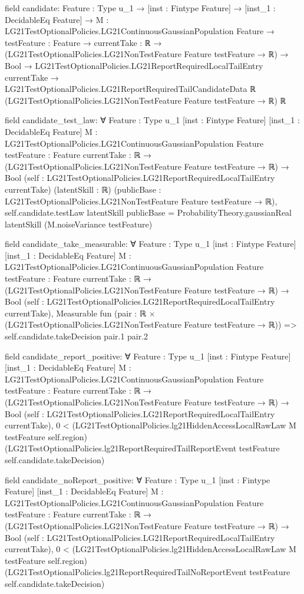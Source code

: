 \documentclass[10pt]{article}
\begin{document}
\begin{ReviewVerbatim}
field candidate:
{Feature : Type u_1} →
  [inst : Fintype Feature] →
    [inst_1 : DecidableEq Feature] →
      {M : LG21TestOptionalPolicies.LG21ContinuousGaussianPopulation Feature} →
        {testFeature : Feature} →
          {currentTake : ℝ → (LG21TestOptionalPolicies.LG21NonTestFeature Feature testFeature → ℝ) → Bool} →
            LG21TestOptionalPolicies.LG21ReportRequiredLocalTailEntry currentTake →
              LG21TestOptionalPolicies.LG21ReportRequiredTailCandidateData ℝ
                (LG21TestOptionalPolicies.LG21NonTestFeature Feature testFeature → ℝ) ℝ

field candidate_test_law:
∀ {Feature : Type u_1} [inst : Fintype Feature] [inst_1 : DecidableEq Feature]
  {M : LG21TestOptionalPolicies.LG21ContinuousGaussianPopulation Feature} {testFeature : Feature}
  {currentTake : ℝ → (LG21TestOptionalPolicies.LG21NonTestFeature Feature testFeature → ℝ) → Bool}
  (self : LG21TestOptionalPolicies.LG21ReportRequiredLocalTailEntry currentTake) (latentSkill : ℝ)
  (publicBase : LG21TestOptionalPolicies.LG21NonTestFeature Feature testFeature → ℝ),
  self.candidate.testLaw latentSkill publicBase =
    ProbabilityTheory.gaussianReal latentSkill (M.noiseVariance testFeature)

field candidate_take_measurable:
∀ {Feature : Type u_1} [inst : Fintype Feature] [inst_1 : DecidableEq Feature]
  {M : LG21TestOptionalPolicies.LG21ContinuousGaussianPopulation Feature} {testFeature : Feature}
  {currentTake : ℝ → (LG21TestOptionalPolicies.LG21NonTestFeature Feature testFeature → ℝ) → Bool}
  (self : LG21TestOptionalPolicies.LG21ReportRequiredLocalTailEntry currentTake),
  Measurable fun (pair : ℝ × (LG21TestOptionalPolicies.LG21NonTestFeature Feature testFeature → ℝ)) =>
    self.candidate.takeDecision pair.1 pair.2

field candidate_report_positive:
∀ {Feature : Type u_1} [inst : Fintype Feature] [inst_1 : DecidableEq Feature]
  {M : LG21TestOptionalPolicies.LG21ContinuousGaussianPopulation Feature} {testFeature : Feature}
  {currentTake : ℝ → (LG21TestOptionalPolicies.LG21NonTestFeature Feature testFeature → ℝ) → Bool}
  (self : LG21TestOptionalPolicies.LG21ReportRequiredLocalTailEntry currentTake),
  0 <
    (LG21TestOptionalPolicies.lg21HiddenAccessLocalRawLaw M testFeature self.region)
      (LG21TestOptionalPolicies.lg21ReportRequiredTailReportEvent testFeature self.candidate.takeDecision)

field candidate_noReport_positive:
∀ {Feature : Type u_1} [inst : Fintype Feature] [inst_1 : DecidableEq Feature]
  {M : LG21TestOptionalPolicies.LG21ContinuousGaussianPopulation Feature} {testFeature : Feature}
  {currentTake : ℝ → (LG21TestOptionalPolicies.LG21NonTestFeature Feature testFeature → ℝ) → Bool}
  (self : LG21TestOptionalPolicies.LG21ReportRequiredLocalTailEntry currentTake),
  0 <
    (LG21TestOptionalPolicies.lg21HiddenAccessLocalRawLaw M testFeature self.region)
      (LG21TestOptionalPolicies.lg21ReportRequiredTailNoReportEvent testFeature self.candidate.takeDecision)


\end{ReviewVerbatim}
\end{document}
